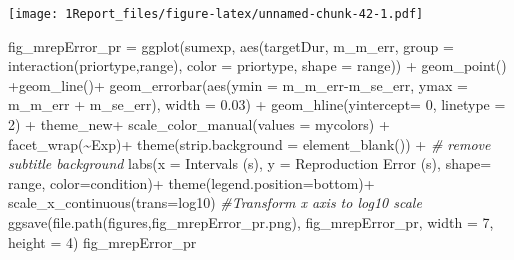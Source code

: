 \documentclass[
]{article}
\newenvironment{Shaded}{\begin{snugshade}}{\end{snugshade}}
\newcommand{\AttributeTok}[1]{\textcolor[rgb]{0.77,0.63,0.00}{#1}}
\newcommand{\CommentTok}[1]{\textcolor[rgb]{0.56,0.35,0.01}{\textit{#1}}}
\newcommand{\DecValTok}[1]{\textcolor[rgb]{0.00,0.00,0.81}{#1}}
\newcommand{\FloatTok}[1]{\textcolor[rgb]{0.00,0.00,0.81}{#1}}
\newcommand{\FunctionTok}[1]{\textcolor[rgb]{0.00,0.00,0.00}{#1}}
\newcommand{\NormalTok}[1]{#1}
\newcommand{\OtherTok}[1]{\textcolor[rgb]{0.56,0.35,0.01}{#1}}
\newcommand{\SpecialCharTok}[1]{\textcolor[rgb]{0.00,0.00,0.00}{#1}}
\newcommand{\StringTok}[1]{\textcolor[rgb]{0.31,0.60,0.02}{#1}}
\begin{document}
\texttt{[image: 1Report\_files/figure-latex/unnamed-chunk-42-1.pdf]}

\begin{Shaded}
\begin{Highlighting}[]
\NormalTok{fig\_mrepError\_pr }\OtherTok{=} \FunctionTok{ggplot}\NormalTok{(sumexp,}
                          \FunctionTok{aes}\NormalTok{(targetDur, }
\NormalTok{                              m\_m\_err, }
                              \AttributeTok{group =} \FunctionTok{interaction}\NormalTok{(priortype,range),}
                              \AttributeTok{color =}\NormalTok{ priortype,}
                              \AttributeTok{shape =}\NormalTok{ range)) }\SpecialCharTok{+} 
  \FunctionTok{geom\_point}\NormalTok{() }\SpecialCharTok{+}\FunctionTok{geom\_line}\NormalTok{()}\SpecialCharTok{+}
  \FunctionTok{geom\_errorbar}\NormalTok{(}\FunctionTok{aes}\NormalTok{(}\AttributeTok{ymin =}\NormalTok{ m\_m\_err}\SpecialCharTok{{-}}\NormalTok{m\_se\_err, }\AttributeTok{ymax =}\NormalTok{ m\_m\_err }\SpecialCharTok{+}\NormalTok{ m\_se\_err), }\AttributeTok{width =} \FloatTok{0.03}\NormalTok{) }\SpecialCharTok{+} 
  \FunctionTok{geom\_hline}\NormalTok{(}\AttributeTok{yintercept=} \DecValTok{0}\NormalTok{, }\AttributeTok{linetype =} \DecValTok{2}\NormalTok{) }\SpecialCharTok{+}
\NormalTok{  theme\_new}\SpecialCharTok{+} 
  \FunctionTok{scale\_color\_manual}\NormalTok{(}\AttributeTok{values =}\NormalTok{ mycolors) }\SpecialCharTok{+}
  \FunctionTok{facet\_wrap}\NormalTok{(}\SpecialCharTok{\textasciitilde{}}\NormalTok{Exp)}\SpecialCharTok{+}
  \FunctionTok{theme}\NormalTok{(}\AttributeTok{strip.background =} \FunctionTok{element\_blank}\NormalTok{()) }\SpecialCharTok{+} \CommentTok{\# remove subtitle background}
  \FunctionTok{labs}\NormalTok{(}\AttributeTok{x =} \StringTok{\textquotesingle{}Intervals (s)\textquotesingle{}}\NormalTok{, }\AttributeTok{y =} \StringTok{\textquotesingle{}Reproduction Error (s)\textquotesingle{}}\NormalTok{, }\AttributeTok{shape=} \StringTok{\textquotesingle{}range\textquotesingle{}}\NormalTok{, }\AttributeTok{color=}\StringTok{\textquotesingle{}condition\textquotesingle{}}\NormalTok{)}\SpecialCharTok{+} \FunctionTok{theme}\NormalTok{(}\AttributeTok{legend.position=}\StringTok{\textquotesingle{}bottom\textquotesingle{}}\NormalTok{)}\SpecialCharTok{+}
  \FunctionTok{scale\_x\_continuous}\NormalTok{(}\AttributeTok{trans=}\StringTok{\textquotesingle{}log10\textquotesingle{}}\NormalTok{) }\CommentTok{\#Transform x axis to log10 scale}
\FunctionTok{ggsave}\NormalTok{(}\FunctionTok{file.path}\NormalTok{(}\StringTok{\textquotesingle{}figures\textquotesingle{}}\NormalTok{,}\StringTok{\textquotesingle{}fig\_mrepError\_pr.png\textquotesingle{}}\NormalTok{), fig\_mrepError\_pr, }\AttributeTok{width =} \DecValTok{7}\NormalTok{, }\AttributeTok{height =} \DecValTok{4}\NormalTok{)}
\NormalTok{fig\_mrepError\_pr}
\end{Highlighting}
\end{Shaded}
\end{document}
